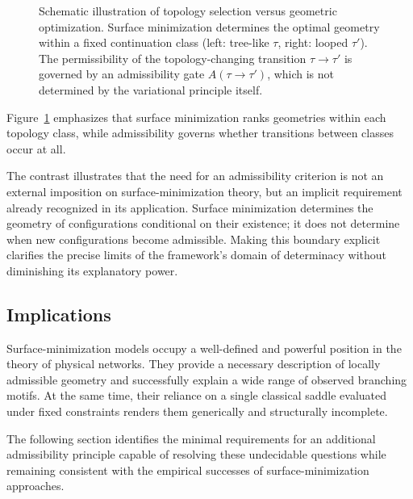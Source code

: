 \begin{figure}[t]
\caption{
Schematic illustration of topology selection versus geometric optimization.
Surface minimization determines the optimal geometry within a fixed continuation class (left: tree-like $\tau$, right: looped $\tau'$).
The permissibility of the topology-changing transition $\tau\!\to\!\tau'$ is governed by an admissibility gate $A(\tau\!\to\!\tau')$, which is not determined by the variational principle itself.
}
\label{fig:topology_admissibility}
\end{figure}
Figure~\ref{fig:topology_admissibility} emphasizes that surface minimization ranks geometries within each topology class, while admissibility governs whether transitions between classes occur at all.

The contrast illustrates that the need for an admissibility criterion is not an external imposition on surface-minimization theory, but an implicit requirement already recognized in its application. Surface minimization determines the geometry of configurations conditional on their existence; it does not determine when new configurations become admissible. Making this boundary explicit clarifies the precise limits of the framework's domain of determinacy without diminishing its explanatory power.

\subsection{Implications}

Surface-minimization models occupy a well-defined and powerful position in the theory of physical networks. They provide a necessary description of locally admissible geometry and successfully explain a wide range of observed branching motifs. At the same time, their reliance on a single classical saddle evaluated under fixed constraints renders them generically and structurally incomplete.

The following section identifies the minimal requirements for an additional admissibility principle capable of resolving these undecidable questions while remaining consistent with the empirical successes of surface-minimization approaches.

\begin{center}
\end{center}
